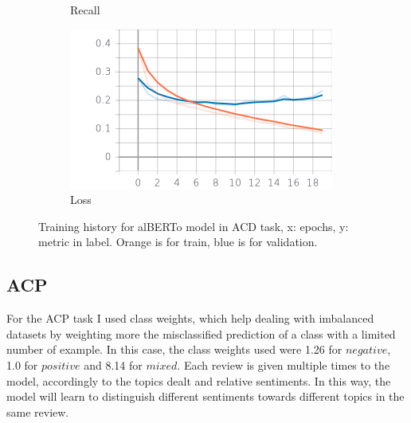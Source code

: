\documentclass{article}
\begin{document}
\begin{figure}
\begin{subfigure}{.33\textwidth}
 		            \caption{Recall}
 		            \label{alberto_acd_epoch_recall}
		        \end{subfigure}
                \begin{subfigure}{.33\textwidth}
 		            \centering
 		            \includegraphics[width=\textwidth]{imgs/plots/alberto_acd_epoch_loss.png}
 		            \caption{Loss}
 		            \label{alberto_acd_epoch_loss}
		        \end{subfigure}
		    \caption{Training history for alBERTo model in ACD task, x: epochs, y: metric in label.
                    \color{orange} Orange is for train, \color{blue} blue is for validation.\color{black}}
		    \label{alberto_acd_history}
	        \end{figure}

        \subsection{ACP}\label{subsec:s1}
            For the ACP task I used class weights, which help dealing with imbalanced datasets by weighting more the misclassified prediction of a class with a limited number of example.
            In this case, the class weights used were 1.26 for $negative$, 1.0 for $positive$ and 8.14 for $mixed$.
            Each review is given multiple times to the model, accordingly to the topics dealt and relative sentiments.
            In this way, the model will learn to distinguish different sentiments towards different topics in the same review.
\end{document}
